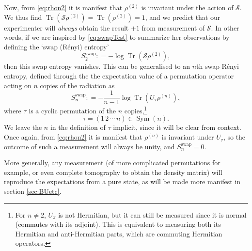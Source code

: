 \documentclass[letterpaper,12pt]{article}
\DeclareMathOperator{\Tr}{Tr}
\DeclareMathOperator{\Sym}{Sym}
\newcommand*{\swap}{\mathcal{S}} %
\begin{document}
Now, from \eqref{eq:rhon2} it is manifest that $\rho^{(2)}$ is invariant under the action of $\swap$. We thus find $\Tr(\swap\rho^{(2)})=\Tr(\rho^{(2)})=1$, and we predict that our experimenter will {\it always} obtain the result $+1$ from measurement of $\swap$. In other words, if
we are inspired by \eqref{eq:swapTest} to summarize her observations by defining the `swap (R\'enyi) entropy'
\begin{equation}
\label{eq:SwapEnt}
S_2^{\text{swap}} : = - \log \Tr \left( \swap \rho^{(2)} \right),
\end{equation}
then this swap entropy vanishes. This can be generalised to an $n$th swap R\'enyi entropy, defined through the the expectation value of a permutation operator acting on $n$ copies of the radiation as
\begin{equation}
\label{eq:SwapEntn}
S_n^{\text{swap}} : = -\frac{1}{n-1} \log \Tr \left( U_\tau \rho^{(n)} \right),
\end{equation}
where $\tau$ is a cyclic permutation of the $n$ copies,\footnote{For $n\neq 2$, $U_\pi$ is not Hermitian, but it can still be measured since it is normal (commutes with its adjoint). This is equivalent to measuring both its Hermitian and anti-Hermitian parts, which are commuting Hermitian operators.}
\begin{equation}\label{eq:tau}
	\tau = (1\,2\,\cdots\,n)\in\Sym(n).
\end{equation}
 We leave the $n$ in the definition of $\tau$ implicit, since it will be clear from context. Once again, from \eqref{eq:rhon2} it is manifest that $\rho^{(n)}$ is invariant under $U_\tau$, so the outcome of such a measurement will always be unity, and $S_n^{\text{swap}}=0$.

More generally, any measurement (of more complicated permutations for example, or even complete tomography to obtain the density matrix) will reproduce the expectations from a pure state, as will be made more manifest in section \ref{sec:BUetc}.
\end{document}
